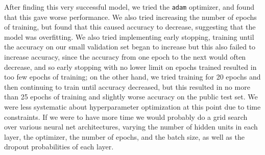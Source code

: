 \begin{itemize}
\begin{itemize}
    After finding this very successful model, we tried the \texttt{adam} optimizer, and found that this gave worse performance. We also tried increasing the number of epochs of training, but found that this caused accuracy to decrease, suggesting that the model was overfitting. We also tried implementing early stopping, training until the accuracy on our small validation set began to increase but this also failed to increase accuracy, since the accuracy from one epoch to the next would often decrease, and so early stopping with no lower limit on epochs trained resulted in too few epochs of training; on the other hand, we tried training for 20 epochs and then continuing to train until accuracy decreased, but this resulted in no more than 25 epochs of training and slightly worse accuracy on the public test set. We were less systematic about hyperparameter optimization at this point due to time constraints. If we were to have more time we would probably do a grid search over various neural net architectures, varying the number of hidden units in each layer, the optimizer, the number of epochs, and the batch size, as well as the dropout probabilities of each layer. 
  \end{itemize}

\end{itemize}


